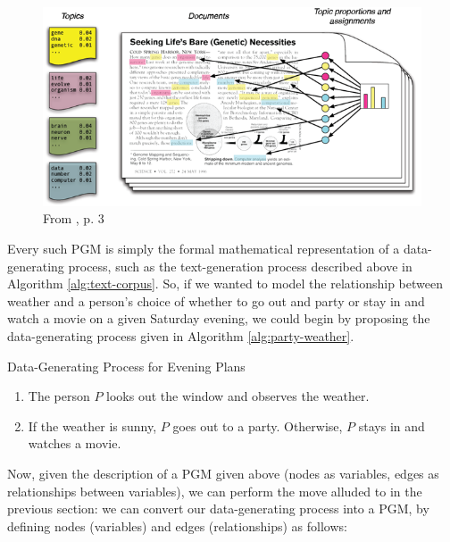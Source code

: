 \documentclass[11pt]{article}
\begin{document}

\begin{figure}
	\centering
	\includegraphics[width=\textwidth]{../figs/blei_lda.png}
	\caption{From \cite{blei_introduction_2012}, p. 3}
	\label{fig:my_label}
\end{figure}

Every such PGM is simply the formal mathematical representation of a data-generating process, such as the text-generation process described above in Algorithm \ref{alg:text-corpus}. So, if we wanted to model the relationship between weather and a person's choice of whether to go out and party or stay in and watch a movie on a given Saturday evening, we could begin by proposing the data-generating process given in Algorithm \ref{alg:party-weather}.

\begin{algorithm}[ht!]
	\caption{Data-Generating Process for Evening Plans}
	\label{alg:party-weather}
	\begin{enumerate}
		\item The person $P$ looks out the window and observes the weather.
		\item If the weather is sunny, $P$ goes out to a party. Otherwise, $P$ stays in and watches a movie.
	\end{enumerate}
\end{algorithm}

Now, given the description of a PGM given above (nodes as variables, edges as relationships between variables), we can perform the move alluded to in the previous section: we can convert our data-generating process into a PGM, by defining nodes (variables) and edges (relationships) as follows:
\end{document}
